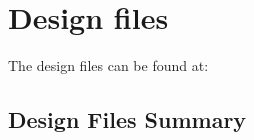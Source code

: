 \documentclass[11pt, letterpaper]{article}
\begin{document}
\section{Design files}

The design files can be found at: 

\subsection{Design Files Summary}

\end{document}

